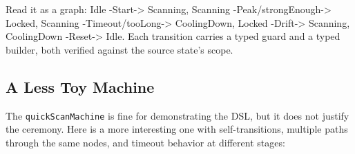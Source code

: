 \documentclass[]{article}
\begin{document}
Read it as a graph: Idle -Start-\textgreater{} Scanning, Scanning
-Peak/strongEnough-\textgreater{} Locked, Scanning
-Timeout/tooLong-\textgreater{} CoolingDown, Locked -Drift-\textgreater{}
Scanning, CoolingDown -Reset-\textgreater{} Idle. Each transition carries a
typed guard and a typed builder, both verified against the source state's scope.

\subsection{A Less Toy Machine}\label{a-less-toy-machine}

The \texttt{quickScanMachine} is fine for demonstrating the DSL, but it does not
justify the ceremony. Here is a more interesting one with self-transitions,
multiple paths through the same nodes, and timeout behavior at different stages:
\end{document}
